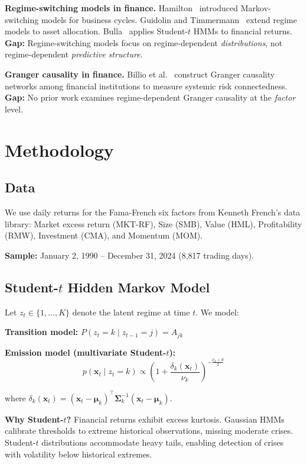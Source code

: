 \documentclass[sigconf]{acmart}
\begin{document}
\textbf{Regime-switching models in finance.}
Hamilton~\cite{hamilton1989new} introduced Markov-switching models for business cycles.
Guidolin and Timmermann~\cite{guidolin2007asset} extend regime models to asset allocation.
Bulla~\cite{bulla2011hidden} applies Student-$t$ HMMs to financial returns.
\textbf{Gap:} Regime-switching models focus on regime-dependent \emph{distributions},
not regime-dependent \emph{predictive structure}.

\textbf{Granger causality in finance.}
Billio et al.~\cite{billio2012econometric} construct Granger causality networks among
financial institutions to measure systemic risk connectedness.
\textbf{Gap:} No prior work examines regime-dependent Granger causality at the
\emph{factor} level.

\section{Methodology}

\subsection{Data}

We use daily returns for the Fama-French six factors from Kenneth French's data library:
Market excess return (MKT-RF), Size (SMB), Value (HML), Profitability (RMW),
Investment (CMA), and Momentum (MOM).

\textbf{Sample:} January 2, 1990 -- December 31, 2024 (8,817 trading days).

\subsection{Student-$t$ Hidden Markov Model}
\label{sec:hmm}

Let $z_t \in \{1, \ldots, K\}$ denote the latent regime at time $t$. We model:

\textbf{Transition model:}
$P(z_t = k \mid z_{t-1} = j) = A_{jk}$

\textbf{Emission model (multivariate Student-$t$):}
\begin{equation}
p(\mathbf{x}_t \mid z_t = k) \propto \left(1 + \frac{\delta_k(\mathbf{x}_t)}{\nu_k}\right)^{-\frac{\nu_k+d}{2}}
\end{equation}

where $\delta_k(\mathbf{x}_t) = (\mathbf{x}_t - \boldsymbol{\mu}_k)^\top\boldsymbol{\Sigma}_k^{-1}(\mathbf{x}_t - \boldsymbol{\mu}_k)$.

\textbf{Why Student-$t$?} Financial returns exhibit excess kurtosis. Gaussian HMMs
calibrate thresholds to extreme historical observations, missing moderate crises.
Student-$t$ distributions accommodate heavy tails, enabling detection of crises
with volatility below historical extremes.
\end{document}
